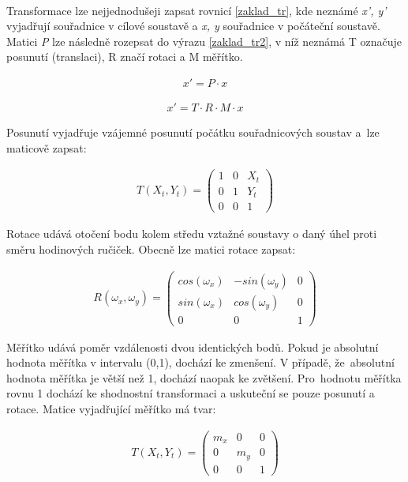 \documentclass[thesis=M,czech]{FITthesis}[2012/06/26]
\begin{document}
\

Transformace lze nejjednodušeji zapsat rovnicí \eqref{zaklad_tr}, kde neznámé \textit{x', y'} vyjadřují souřadnice v cílové soustavě a \textit{x, y} souřadnice v počáteční soustavě. Matici \textit{P} lze následně rozepsat do výrazu \eqref{zaklad_tr2}, v níž neznámá T označuje posunutí (translaci), R značí rotaci a M měřítko.

\begin{align}\label{zaklad_tr}
x' = P \cdot x
\end{align}

\begin{align}\label{zaklad_tr2}
x' = T \cdot R \cdot M \cdot x
\end{align}

Posunutí vyjadřuje vzájemné posunutí počátku souřadnicových soustav a~lze maticově zapsat:

\begin{align} \label{matT}
T (X_t, Y_t) = \begin{pmatrix}
    1 & 0 & X_t \\
    0 & 1 & Y_t \\
    0 & 0 & 1 
\end{pmatrix}
\end{align}

Rotace udává otočení bodu kolem středu vztažné soustavy o daný úhel proti směru hodinových ručiček. Obecně lze matici rotace zapsat:

\begin{align} \label{matR}
R (\omega_x, \omega_y) = \begin{pmatrix}
    cos(\omega_x) & -sin(\omega_y) & 0 \\
    sin(\omega_x) & cos(\omega_y) & 0 \\
    0 & 0 & 1 
\end{pmatrix}
\end{align}

Měřítko udává poměr vzdálenosti dvou identických bodů. Pokud je absolutní hodnota měřítka v intervalu (0,1), dochází ke zmenšení. V případě, že~absolutní hodnota měřítka je větší než 1, dochází naopak ke zvětšení. Pro~hodnotu měřítka rovnu 1 dochází ke shodnostní transformaci a uskuteční se pouze posunutí a rotace. Matice vyjadřující měřítko má tvar:

\begin{align} \label{matM}
T (X_t, Y_t) = \begin{pmatrix}
    m_x & 0 & 0 \\
    0 & m_y & 0 \\
    0 & 0 & 1 
\end{pmatrix}
\end{align}
\end{document}
